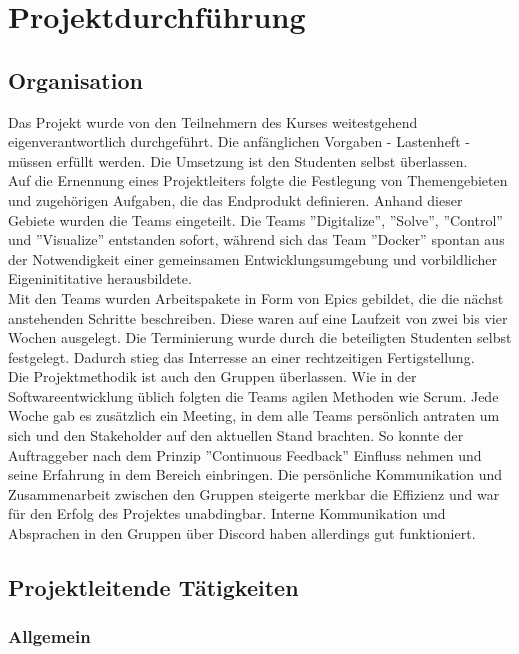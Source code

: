 \section[Projektdurchführung]{Projektdurchführung }
\subsection{Organisation}
Das Projekt wurde von den Teilnehmern des Kurses weitestgehend eigenverantwortlich durchgeführt. Die anfänglichen Vorgaben - Lastenheft - müssen erfüllt werden. Die Umsetzung ist den Studenten selbst überlassen. \\
Auf die Ernennung eines Projektleiters folgte die Festlegung von Themengebieten und zugehörigen Aufgaben, die das Endprodukt definieren. Anhand dieser Gebiete wurden die Teams eingeteilt. Die Teams ”Digitalize”, ”Solve”, ”Control” und ”Visualize” entstanden sofort, während sich das Team ”Docker” spontan aus der Notwendigkeit einer gemeinsamen Entwicklungsumgebung und vorbildlicher Eigeninititative herausbildete. \\
Mit den Teams wurden Arbeitspakete in Form von Epics gebildet, die die nächst anstehenden Schritte beschreiben. Diese waren auf eine Laufzeit von zwei bis vier Wochen ausgelegt.
Die Terminierung wurde durch die beteiligten Studenten selbst festgelegt. Dadurch stieg das Interresse an einer rechtzeitigen Fertigstellung. \\ Die Projektmethodik ist auch den Gruppen überlassen. Wie in der Softwareentwicklung üblich folgten die Teams agilen Methoden wie Scrum.
Jede Woche gab es zusätzlich ein Meeting, in dem alle Teams persönlich antraten um sich und den Stakeholder auf den aktuellen Stand brachten. So konnte der Auftraggeber nach dem Prinzip ”Continuous Feedback” Einfluss nehmen und seine Erfahrung in dem Bereich einbringen. Die persönliche Kommunikation und Zusammenarbeit zwischen den Gruppen steigerte merkbar die Effizienz und war für den Erfolg des Projektes unabdingbar. Interne Kommunikation und Absprachen in den Gruppen über Discord haben allerdings gut funktioniert.

\subsection{Projektleitende Tätigkeiten}
\subsubsection{Allgemein}


